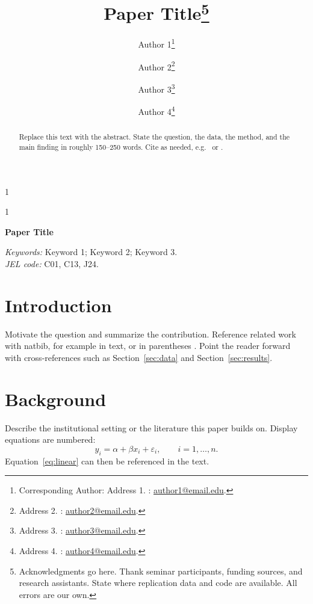 \documentclass[12pt]{article}
\makeatletter
\newcommand{\blind}{1}
\newcommand{\papertitle}{Paper Title}
\newcommand{\paperauthors}{%
    Author 1\thanks{Corresponding Author: Address 1. \faEnvelopeO: \href{mailto:author1@email.edu}{author1@email.edu}.} \and
    Author 2\thanks{Address 2. \faEnvelopeO: \href{mailto:author2@email.edu}{author2@email.edu}.} \and
    Author 3\thanks{Address 3. \faEnvelopeO: \href{mailto:author3@email.edu}{author3@email.edu}.} \and
    Author 4\thanks{Address 4. \faEnvelopeO: \href{mailto:author4@email.edu}{author4@email.edu}.}%
}
\makeatother
\begin{document}
\begin{bibunit}[jpe]

\def\spacingset#1{\renewcommand{\baselinestretch}%
{#1}\small\normalsize} \spacingset{1}

\blind
{
\title{\papertitle\thanks{Acknowledgments go here. Thank seminar participants, funding sources, and research assistants. State where replication data and code are available. All errors are our own.}}
\author{\paperauthors}
\maketitle
} \fi

\blind
{
  \bigskip
  \bigskip
  \bigskip
  \begin{center}
    {\LARGE\bf \papertitle}
  \end{center}
  \medskip
} \fi

\bigskip
\begin{abstract}
\noindent Replace this text with the abstract. State the question, the data, the method, and the main finding in roughly 150--250 words. Cite as needed, e.g.\ \citet{entry1} or \citep{entry2}.
\end{abstract}

\noindent%
{\it Keywords:} Keyword 1; Keyword 2; Keyword 3.
\\
\noindent%
{\it JEL code:} C01, C13, J24.

\vfill

\newpage

\spacingset{1.56} %

\section{Introduction}\label{sec:intro}
Motivate the question and summarize the contribution. Reference related work with natbib, for example \citet{entry1} in text, or in parentheses \citep{entry2, entry3}. Point the reader forward with cross-references such as Section~\ref{sec:data} and Section~\ref{sec:results}.

\section{Background}\label{sec:background}
Describe the institutional setting or the literature this paper builds on. Display equations are numbered:
\begin{equation}
    y_i = \alpha + \beta x_i + \varepsilon_i, \qquad i = 1, \ldots, n.
    \label{eq:linear}
\end{equation}
Equation~\eqref{eq:linear} can then be referenced in the text.


\end{bibunit}
\end{document}
